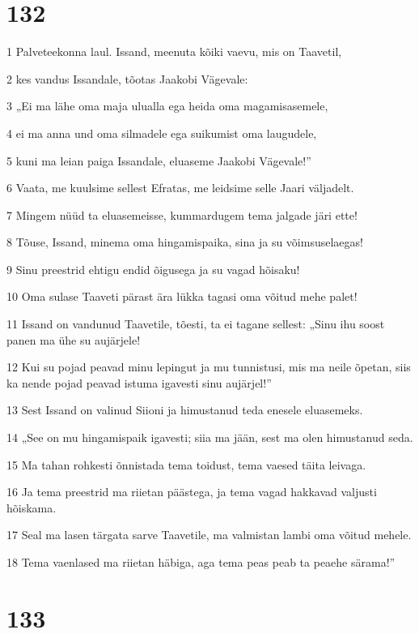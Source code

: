 \chapter{132}

\par 1 Palveteekonna laul. Issand, meenuta kõiki vaevu, mis on Taavetil,
\par 2 kes vandus Issandale, tõotas Jaakobi Vägevale:
\par 3 „Ei ma lähe oma maja ulualla ega heida oma magamisasemele,
\par 4 ei ma anna und oma silmadele ega suikumist oma laugudele,
\par 5 kuni ma leian paiga Issandale, eluaseme Jaakobi Vägevale!”
\par 6 Vaata, me kuulsime sellest Efratas, me leidsime selle Jaari väljadelt.
\par 7 Mingem nüüd ta eluasemeisse, kummardugem tema jalgade järi ette!
\par 8 Tõuse, Issand, minema oma hingamispaika, sina ja su võimsuselaegas!
\par 9 Sinu preestrid ehtigu endid õigusega ja su vagad hõisaku!
\par 10 Oma sulase Taaveti pärast ära lükka tagasi oma võitud mehe palet!
\par 11 Issand on vandunud Taavetile, tõesti, ta ei tagane sellest: „Sinu ihu soost panen ma ühe su aujärjele!
\par 12 Kui su pojad peavad minu lepingut ja mu tunnistusi, mis ma neile õpetan, siis ka nende pojad peavad istuma igavesti sinu aujärjel!”
\par 13 Sest Issand on valinud Siioni ja himustanud teda enesele eluasemeks.
\par 14 „See on mu hingamispaik igavesti; siia ma jään, sest ma olen himustanud seda.
\par 15 Ma tahan rohkesti õnnistada tema toidust, tema vaesed täita leivaga.
\par 16 Ja tema preestrid ma riietan päästega, ja tema vagad hakkavad valjusti hõiskama.
\par 17 Seal ma lasen tärgata sarve Taavetile, ma valmistan lambi oma võitud mehele.
\par 18 Tema vaenlased ma riietan häbiga, aga tema peas peab ta peaehe särama!”

\chapter{133}

